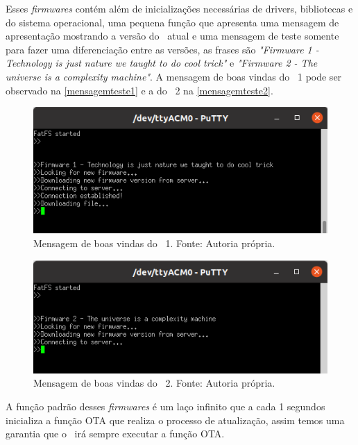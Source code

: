 Esses \textit{firmwares} contém além de inicializações necessárias de drivers, bibliotecas e do sistema operacional, uma pequena função que apresenta uma mensagem de apresentação mostrando a versão do \firmware\ atual e uma mensagem de teste somente para fazer uma diferenciação entre as versões, as frases são \textit{"Firmware 1 - Technology is just nature we taught to do cool trick"} e \textit{"Firmware 2 - The universe is a complexity machine"}. A mensagem de boas vindas do \firmware\ 1 pode ser observado na \autoref{mensagemteste1} e a do \firmware\ 2 na \autoref{mensagemteste2}. 

\begin{figure}[H]
    \scriptsize
     \centering
     \includegraphics[scale=1]{dados/figuras/mensagem1.png}
     \caption{Mensagem de boas vindas do \firmware\ 1. \newline Fonte: Autoria própria.}
     \label{mensagemteste1}
\end{figure}
\begin{figure}[H]
    \scriptsize
     \centering
     \includegraphics[scale=1]{dados/figuras/mensagem2.png}
     \caption{Mensagem de boas vindas do \firmware\ 2. \newline Fonte: Autoria própria.}
     \label{mensagemteste2}
\end{figure}

A função padrão desses \textit{firmwares} é um laço infinito que a cada 1 segundos inicializa a função OTA que realiza o processo de atualização, assim temos uma garantia que o \firmware\ irá sempre executar a função OTA.


